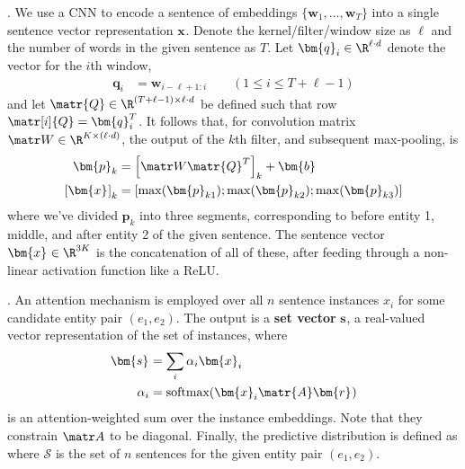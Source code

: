 \documentclass[11pt]{article}
\renewcommand\vec[2][]{\bm{#2}_{#1}}
\newcommand\myspace[1][]{\vspace{#1\bigskipamount}}
\newcommand\p{\Needspace{10\baselineskip} \noindent}
\begin{document}
\myspace
\p {}. We use a CNN to encode a sentence of embeddings $\{ \vec[1]{w}, \ldots, \vec[T]{w}  \}$ into a single sentence vector representation $\vec x$. Denote the kernel/filter/window size as $\ell$ and the number of words in the given sentence as $T$. Let $\vec[i]{q} \in \R^{\ell \cdot d}$ denote the vector for the $i$th window,
\begin{align}
	\vec[i]{q} &= \vec[i-\ell+1:i]{w} \qquad (1 \le i \le T + \ell - 1)
\end{align}
and let $\matr{Q} \in \R^{(T + \ell - 1) \times \ell \cdot d}$ be defined such that row $\matr[i]{Q} = \vec[i]{q}^T$. 
It follows that, for convolution matrix $\matr W \in \R^{K \times (\ell \cdot d)}$, the output of the $k$th filter, and subsequent max-pooling, is
\begin{align}
	\vec[k]{p} &= \left[ \matr W \matr{Q}^T \right]_k + \vec  b \\
	\left[\vec x\right]_k &= \left[
		\max(\vec[k1]{p});
		\max(\vec[k2]{p});
		\max(\vec[k3]{p})
	\right]
\end{align}
where we've divided $\vec[k]{p}$ into three segments, corresponding to before entity 1, middle, and after entity 2 of the given sentence. The sentence vector $\vec x \in \R^{3K}$ is the concatenation of all of these, after feeding through a non-linear activation function like a ReLU. 

\myspace
\p {}. An attention mechanism is employed over all $n$ sentence instances $x_i$ for some candidate entity pair $(e_1, e_2)$. The output is a \textbf{set vector} $\vec s$, a real-valued vector representation of the set of instances, where
\begin{align}
	\vec s &= \sum_i \alpha_i \vec[i]{x} \\
	\alpha_i &= \text{softmax}(\vec[i]{x} \matr{A} \vec{r})
\end{align}
is an attention-weighted sum over the instance embeddings. Note that they constrain $\matr A$ to be diagonal. Finally, the predictive distribution is defined as
\graybox{
	p(r \mid \mathcal{S}, (e_1, e_2) \theta)
		&= \text{softmax}\left(\matr{M}\vec{s} + \vec{d} \right)_r 	
}
where $\mathcal{S}$ is the set of $n$ sentences for the given entity pair $(e_1, e_2)$. 






\end{document}
